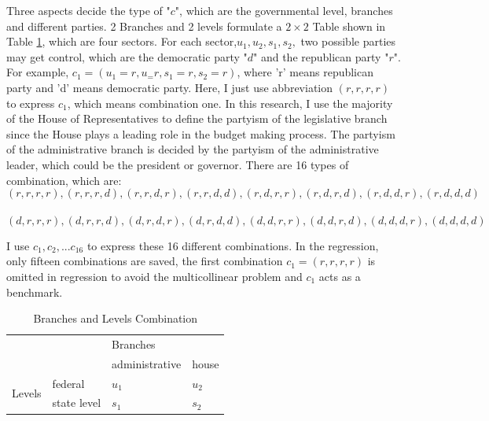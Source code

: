 Three aspects decide the type of "$c$", which are the governmental level, branches and different parties. 2 Branches and 2 levels formulate a $2\times2$ Table shown in Table \ref*{Table 2.6}, which are four sectors. For each sector,$ u_1, u_2, s_1, s_2,$ two possible parties may get control, which are the democratic party "$d$" and the republican party "$r$". For example, $c_1 = (u_1 = r, u_ = r, s_1 = r, s_2 = r)$, where ’r’ means republican party and ’d’ means democratic party. Here, I just use abbreviation $(r,r,r,r)$ to express $c_1$, which means combination one. In this research, I use the majority of the House of Representatives to define the partyism of the legislative branch since the House plays a leading role in the budget making process. The partyism of the administrative branch is decided by the partyism of the administrative leader, which could be the president or governor. There are 16 types of combination, which are:
$$(r, r, r, r), (r, r, r, d), (r, r, d, r), (r, r, d, d), (r, d, r, r), (r, d, r, d), (r, d, d, r), (r, d, d, d)$$\\$$(d, r, r, r), (d, r, r, d), (d, r, d, r), (d, r, d, d), (d, d, r, r), (d, d, r, d), (d, d, d, r), (d, d, d, d) $$

I use $c_1, c_2, . . . c_{16}$ to express these 16 different combinations. In the regression,
only fifteen combinations are saved, the first combination $c_1 = (r, r, r, r)$ is omitted in regression to avoid the multicollinear problem and $c_1$ acts as a benchmark.

\begin{table}[H]
  \centering
  \caption{Branches and Levels Combination}
  \begin{tabular}{cp{7.145em}p{8.43em}p{6.145em}}
    \toprule
    \multicolumn{2}{c}{\multirow{2}[4]{*}{}}       & \multicolumn{2}{p{14.575em}}{Branches}                 \\
    \cmidrule{3-4}    \multicolumn{2}{c}{}         & administrative                         & house         \\
    \midrule
    \multicolumn{1}{c}{\multirow{2}[4]{*}{Levels}} & federal                                & $u_1$ & $u_2$ \\
    \cmidrule{2-4}                                 & state level                            & $s_1$ & $s_2$ \\
    \bottomrule
  \end{tabular}%
  \label{Table 2.6}%
\end{table}%


